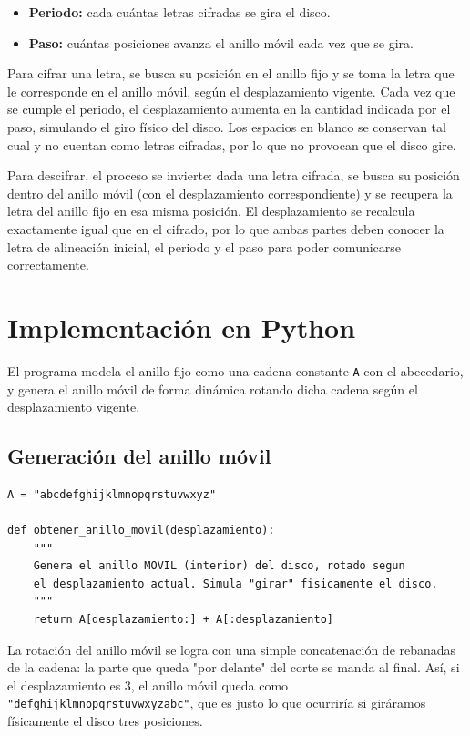 \documentclass[letterpaper,12pt]{article}
\begin{document}
\begin{itemize}
    \item \textbf{Periodo:} cada cuántas letras cifradas se gira el disco.
    \item \textbf{Paso:} cuántas posiciones avanza el anillo móvil cada vez que se gira.
\end{itemize}

Para cifrar una letra, se busca su posición en el anillo fijo y se toma la letra que le
corresponde en el anillo móvil, según el desplazamiento vigente. Cada vez que se cumple el
periodo, el desplazamiento aumenta en la cantidad indicada por el paso, simulando el giro
físico del disco. Los espacios en blanco se conservan tal cual y no cuentan como letras
cifradas, por lo que no provocan que el disco gire.

Para descifrar, el proceso se invierte: dada una letra cifrada, se busca su posición dentro
del anillo móvil (con el desplazamiento correspondiente) y se recupera la letra del anillo
fijo en esa misma posición. El desplazamiento se recalcula exactamente igual que en el
cifrado, por lo que ambas partes deben conocer la letra de alineación inicial, el periodo y
el paso para poder comunicarse correctamente.

\section{Implementación en Python}

El programa modela el anillo fijo como una cadena constante \texttt{A} con el abecedario, y
genera el anillo móvil de forma dinámica rotando dicha cadena según el desplazamiento
vigente.

\subsection{Generación del anillo móvil}

\begin{lstlisting}[style=pythonstyle]
A = "abcdefghijklmnopqrstuvwxyz"

def obtener_anillo_movil(desplazamiento):
    """
    Genera el anillo MOVIL (interior) del disco, rotado segun
    el desplazamiento actual. Simula "girar" fisicamente el disco.
    """
    return A[desplazamiento:] + A[:desplazamiento]
\end{lstlisting}

La rotación del anillo móvil se logra con una simple concatenación de rebanadas de la
cadena: la parte que queda "por delante" del corte se manda al final. Así, si el
desplazamiento es 3, el anillo móvil queda como \texttt{"defghijklmnopqrstuvwxyzabc"}, que
es justo lo que ocurriría si giráramos físicamente el disco tres posiciones.
\end{document}
